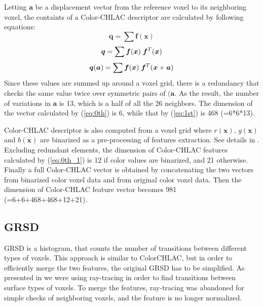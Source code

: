 \documentclass[conference]{sty/IEEEtran}
\begin{document}
Letting ${\bm a}$ be a displacement vector from the reference voxel to its neighboring voxel, 
   the containts of a Color-CHLAC descriptor are calculated by following equations:
\begin{equation}\label{eq:0th}
  {\bm q} = \sum \bm{f}({\bm x})
\end{equation}
\begin{equation}\label{eq:0th_1}
  {\bm q} = \sum \bm{f}({\bm x}) \hspace{1mm}\bm{f}^T({\bm x}) \\
\end{equation}
\begin{equation}\label{eq:1st}
  {\bm q}({\bm a}) = \sum \bm{f}({\bm x}) \hspace{1mm}\bm{f}^T({\bm x}+{\bm a}) \\
\end{equation}
%
Since these values are summed up around a voxel grid, there is a redundancy that checks the same value twice over symmetric pairs of ${(\bm a}$. 
As the result, the number of variations in ${\bm a}$ is 13, which is a half of all the 26 neighbors.
The dimension of the vector calculated by (\ref{eq:0th}) is 6, while that by (\ref{eq:1st}) is 468 (=6*6*13).

Color-CHLAC descriptor is also computed from a voxel grid where $r(\bm{x})$, $g(\bm{x})$ and $b(\bm{x})$ are binarized as a pre-processing of features extraction. See details in \cite{kanezaki2010icra}. 
Excluding redundant elements, the dimension of Color-CHLAC features calculated by (\ref{eq:0th_1}) is 12 if color values are binarized, and 21 otherwise. 
Finally a full Color-CHLAC vector is obtained by concatenating the two vectors from binarized color voxel data and from original color voxel data. 
Then the dimension of Color-CHLAC feature vector becomes 981 (=6+6+468+468+12+21).

\subsection{GRSD}
%
GRSD is a histogram, that counts the number of transitions between different types of voxels.
This approach is similar to ColorCHLAC, but in order to efficiently merge the two features,
the original GRSD has to be simplified. As presented in \cite{GRSD10Humanoids} we were using
ray-tracing in order to find transitions between surface types of voxels. To merge the features,
ray-tracing was abandoned for simple checks of neighboring voxels, and the feature is no longer normalized.
\end{document}
